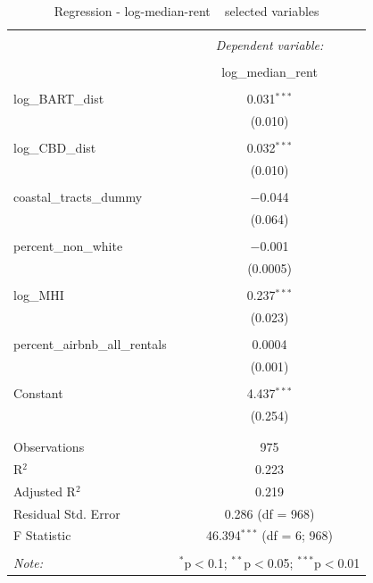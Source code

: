\documentclass[10pt, letterpaper]{amsart}
\begin{document}



\begin{table}[!htbp] \centering 
  \caption{Regression - log-median-rent ~ selected variables} 
  \label{} 
  \begin{tabular}{@{\extracolsep{5pt}}lc} 
    \\[-1.8ex]\hline 
    \hline \\[-1.8ex] 
    & \multicolumn{1}{c}{\textit{Dependent variable:}} \\ 
    \cline{2-2} 
    \\[-1.8ex] & log\_median\_rent \\ 
    \hline \\[-1.8ex] 
    log\_BART\_dist & 0.031$^{***}$ \\ 
    & (0.010) \\ 
    & \\ 
    log\_CBD\_dist & 0.032$^{***}$ \\ 
    & (0.010) \\ 
    & \\ 
    coastal\_tracts\_dummy & $-$0.044 \\ 
    & (0.064) \\ 
    & \\ 
    percent\_non\_white & $-$0.001 \\ 
    & (0.0005) \\ 
    & \\ 
    log\_MHI & 0.237$^{***}$ \\ 
    & (0.023) \\ 
    & \\ 
    percent\_airbnb\_all\_rentals & 0.0004 \\ 
    & (0.001) \\ 
    & \\ 
    Constant & 4.437$^{***}$ \\ 
    & (0.254) \\ 
    & \\ 
    \hline \\[-1.8ex] 
    Observations & 975 \\ 
    R$^{2}$ & 0.223 \\ 
    Adjusted R$^{2}$ & 0.219 \\ 
    Residual Std. Error & 0.286 (df = 968) \\ 
    F Statistic & 46.394$^{***}$ (df = 6; 968) \\ 
    \hline 
    \hline \\[-1.8ex] 
    \textit{Note:}  & \multicolumn{1}{r}{$^{*}$p$<$0.1; $^{**}$p$<$0.05; $^{***}$p$<$0.01} \\ 
  \end{tabular} 
\end{table} 
\end{document}
